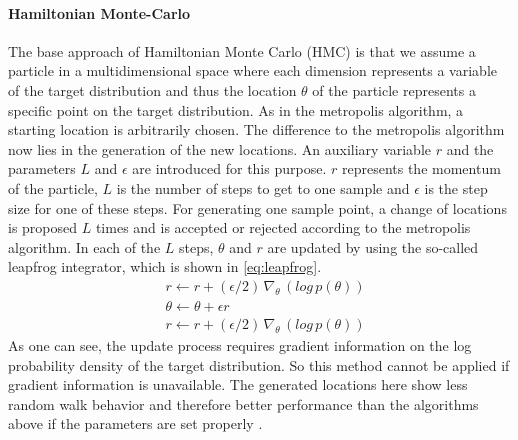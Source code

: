 \documentclass{article}
\begin{document}
\paragraph{Hamiltonian Monte-Carlo}
The base approach of Hamiltonian Monte Carlo (HMC) is that we assume a particle in a multidimensional space where each dimension represents a variable of the target distribution and thus the location $\theta$ of the particle represents a specific point on the target distribution. As in the metropolis algorithm, a starting location is arbitrarily chosen. The difference to the metropolis algorithm now lies in the generation of the new locations. An auxiliary variable $r$ and the parameters $L$ and $\epsilon$ are introduced for this purpose. $r$ represents the momentum of the particle, $L$ is the number of steps to get to one sample and $\epsilon$ is the step size for one of these steps. For generating one sample point, a change of locations is proposed $L$ times and is accepted or rejected according to the metropolis algorithm. In each of the $L$ steps, $\theta$ and $r$ are updated by using the so-called leapfrog integrator, which is shown in \autoref{eq:leapfrog}. 
\begin{equation}
\begin{split}
\label{eq:leapfrog}
&r \leftarrow r + (\epsilon/2)  \, \nabla_\theta \, (log \, p(\theta))\\
&\theta \leftarrow \theta + \epsilon r\\
&r \leftarrow r + (\epsilon/2) \, \nabla_\theta \, (log \, p(\theta))
\end{split}
\end{equation}
As one can see, the update process requires gradient information on the log probability density of the target distribution. So this method cannot be applied if gradient information is unavailable. The generated locations here show less random walk behavior and therefore better performance than the algorithms above if the parameters are set properly \cite{hoffman2014no}.

\end{document}
